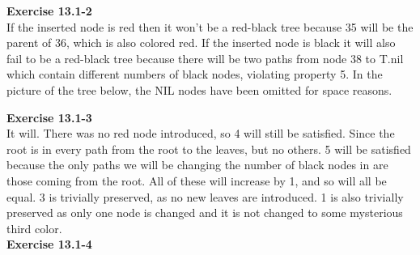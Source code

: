 \documentclass{article}
\begin{document}
\noindent\textbf{Exercise 13.1-2}\\

If the inserted node is red then it won't be a red-black tree because 35 will be the parent of 36, which is also colored red.  If the inserted node is black it will also fail to be a red-black tree because there will be two paths from node 38 to T.nil which contain different numbers of black nodes, violating property 5. In the picture of the tree below, the NIL nodes have been omitted for space reasons.



\noindent\textbf{ Exercise 13.1-3} \\

It will. There was no red node introduced, so 4 will still be satisfied. Since the root is in every path from the root to the leaves, but no others. 5 will be satisfied because the only paths we will be changing the number of black nodes in are those coming from the root. All of these will increase by 1, and so will all be equal. 3 is trivially preserved, as no new leaves are introduced. 1 is also trivially preserved as only one node is changed and it is not changed to some mysterious third color.\\

\noindent\textbf{Exercise 13.1-4}\\
\end{document}
